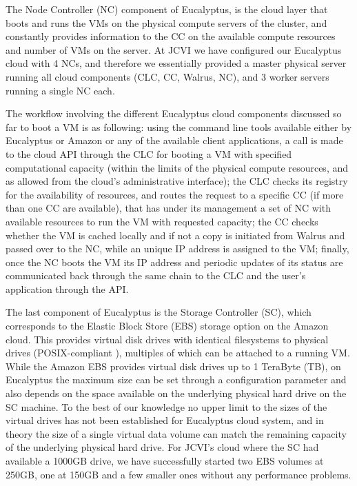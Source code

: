 \documentclass[10pt]{bmc_article}
\newenvironment{bmcformat}{\baselineskip20pt\sloppy\setboolean{publ}{false}}{\baselineskip20pt\sloppy}
\begin{document}
\begin{bmcformat}
The Node Controller (NC) component of Eucalyptus, is the cloud layer that boots and runs the VMs on the physical compute servers of the 
cluster, and constantly provides information to the CC on the available compute resources and number of VMs on the server. At JCVI we 
have configured our Eucalyptus cloud with 4 NCs, and therefore we essentially provided a master physical server running all cloud 
components (CLC, CC, Walrus, NC), and 3 worker servers running a single NC each. 

The workflow involving the different Eucalyptus cloud components discussed so far to boot a VM is as following: using the command line tools 
available either by Eucalyptus or Amazon or any of the available client applications, a call is made to the cloud API through the CLC for booting 
a VM with specified computational capacity (within the limits of the physical compute resources, and as allowed from the cloud's administrative
interface); the CLC checks its registry for the availability of resources, and routes the request to a specific CC (if more than one CC are available), 
that has under its management a set of NC with available resources to run the VM with requested capacity; the CC checks whether the VM is cached 
locally and if not a copy is initiated from Walrus and passed over to the NC, while an unique IP address is assigned to the VM; finally, once the NC 
boots the VM its IP address and periodic updates of its status are communicated back through the same chain to the CLC and the user's application 
through the API.

The last component of Eucalyptus is the Storage Controller (SC), which corresponds to the Elastic Block Store (EBS) storage option on the 
Amazon cloud. This provides virtual disk drives with identical filesystems to physical drives (POSIX-compliant \cite{mathur2007new}),  multiples
of which can be attached to a running VM. While the Amazon EBS provides virtual disk drives up to 1 TeraByte (TB), on Eucalyptus the maximum
size can be set through a configuration parameter and also depends on the space available on the underlying physical hard drive on the SC machine. 
To the best of our knowledge no upper limit to the sizes of the virtual drives has not been established for Eucalyptus cloud system, and in theory the 
size of a single virtual data volume can match the remaining capacity of the underlying physical hard drive. For JCVI's cloud where the SC had 
available a 1000GB drive, we have successfully started two EBS volumes at 250GB, one at 150GB and a few smaller ones without any performance problems.


\end{bmcformat}
\end{document}
